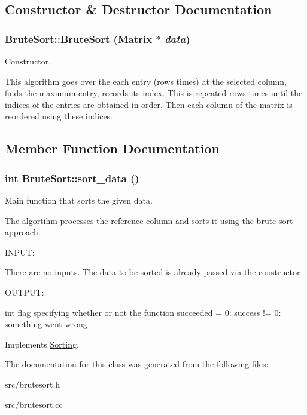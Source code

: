 \subsection{Constructor \& Destructor Documentation}
\hypertarget{classBruteSort_af173d86f16480c1e08de8cb156d29205}{
\subsubsection[{BruteSort}]{\setlength{\rightskip}{0pt plus 5cm}BruteSort::BruteSort ({\bf Matrix} $\ast$ {\em data})}}
\label{d7/d98/classBruteSort_af173d86f16480c1e08de8cb156d29205}


Constructor. 

This algorithm goes over the each entry (rows times) at the selected column, finds the maximum entry, records its index. This is repeated rows times until the indices of the entries are obtained in order. Then each column of the matrix is reordered using these indices. 

\subsection{Member Function Documentation}
\hypertarget{classBruteSort_ae1345f8f8ddc289832816d900226fc1e}{
\subsubsection[{sort\_\-data}]{\setlength{\rightskip}{0pt plus 5cm}int BruteSort::sort\_\-data ()}}
\label{d7/d98/classBruteSort_ae1345f8f8ddc289832816d900226fc1e}


Main function that sorts the given data. 

The algortihm processes the reference column and sorts it using the brute sort approach.

\begin{DoxyVerb}
  INPUT:

  There are no inputs. The data to be sorted is already passed via the constructor

  
  OUTPUT:

  int          flag specifying whether or not the function succeeded
                = 0: success
	       != 0: something went wrong

  \end{DoxyVerb}
 

Implements \hyperlink{classSorting_a6686201265fbb31ba9c2071623742be1}{Sorting}.



The documentation for this class was generated from the following files:\begin{DoxyCompactItemize}
\item 
src/brutesort.h\item 
src/brutesort.cc\end{DoxyCompactItemize}
